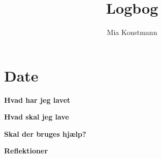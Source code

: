 \documentclass{article}
\title{Logbog}
\author{Mia Konstmann}
\date{}
\begin{document}
	\maketitle
	\tableofcontents
	
	\section{Date}
	
	\textbf{Hvad har jeg lavet}
	
	
	\textbf{Hvad skal jeg lave}
	
	\textbf{Skal der bruges hjælp?}
	
	\textbf{Reflektioner}
\end{document}
